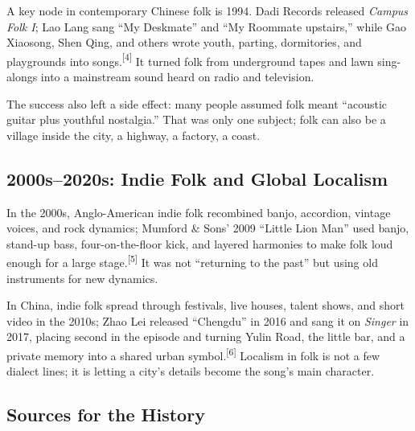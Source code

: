 A key node in contemporary Chinese folk is 1994. Dadi Records released \emph{Campus Folk I}; Lao Lang sang ``My Deskmate'' and ``My Roommate upstairs,'' while Gao Xiaosong, Shen Qing, and others wrote youth, parting, dormitories, and playgrounds into songs.{\textsuperscript{[4]}} It turned folk from underground tapes and lawn sing-alongs into a mainstream sound heard on radio and television.

The success also left a side effect: many people assumed folk meant ``acoustic guitar plus youthful nostalgia.'' That was only one subject; folk can also be a village inside the city, a highway, a factory, a coast.

\subsection{2000s--2020s: Indie Folk and Global Localism}
\label{sec:folk-history-2000s}

In the 2000s, Anglo-American indie folk recombined banjo, accordion, vintage voices, and rock dynamics; Mumford \& Sons' 2009 ``Little Lion Man'' used banjo, stand-up bass, four-on-the-floor kick, and layered harmonies to make folk loud enough for a large stage.{\textsuperscript{[5]}} It was not ``returning to the past'' but using old instruments for new dynamics.

In China, indie folk spread through festivals, live houses, talent shows, and short video in the 2010s; Zhao Lei released ``Chengdu'' in 2016 and sang it on \emph{Singer} in 2017, placing second in the episode and turning Yulin Road, the little bar, and a private memory into a shared urban symbol.{\textsuperscript{[6]}} Localism in folk is not a few dialect lines; it is letting a city's details become the song's main character.

\subsection{Sources for the History}
\label{sec:folk-sources}

